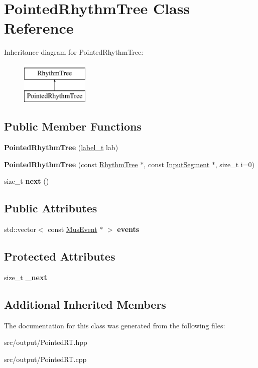 \hypertarget{classPointedRhythmTree}{}\section{Pointed\+Rhythm\+Tree Class Reference}
\label{classPointedRhythmTree}
Inheritance diagram for Pointed\+Rhythm\+Tree\+:\begin{figure}[H]
\begin{center}
\leavevmode
\includegraphics[height=2.000000cm]{classPointedRhythmTree}
\end{center}
\end{figure}
\subsection*{Public Member Functions}
\begin{DoxyCompactItemize}
\item 
{\bfseries Pointed\+Rhythm\+Tree} (\mbox{\hyperlink{group__output_ga22fde970e635fcf63962743b2d5c441d}{label\+\_\+t}} lab)
\item 
{\bfseries Pointed\+Rhythm\+Tree} (const \mbox{\hyperlink{classRhythmTree}{Rhythm\+Tree}} $\ast$, const \mbox{\hyperlink{classInputSegment}{Input\+Segment}} $\ast$, size\+\_\+t i=0)
\item 
\mbox{\label{classPointedRhythmTree_a8faa96c4256d16d554985195c0487c0b}} 
size\+\_\+t {\bfseries next} ()
\end{DoxyCompactItemize}
\subsection*{Public Attributes}
\begin{DoxyCompactItemize}
\item 
\mbox{\label{classPointedRhythmTree_a404071b821179c511a3f9b1e0d6e9ad8}} 
std\+::vector$<$ const \mbox{\hyperlink{classMusEvent}{Mus\+Event}} $\ast$ $>$ {\bfseries events}
\end{DoxyCompactItemize}
\subsection*{Protected Attributes}
\begin{DoxyCompactItemize}
\item 
\mbox{\label{classPointedRhythmTree_a8bbbb0e996dbe12dbc41eeede70f0527}} 
size\+\_\+t {\bfseries \+\_\+next}
\end{DoxyCompactItemize}
\subsection*{Additional Inherited Members}


The documentation for this class was generated from the following files\+:\begin{DoxyCompactItemize}
\item 
src/output/Pointed\+R\+T.\+hpp\item 
src/output/Pointed\+R\+T.\+cpp\end{DoxyCompactItemize}
